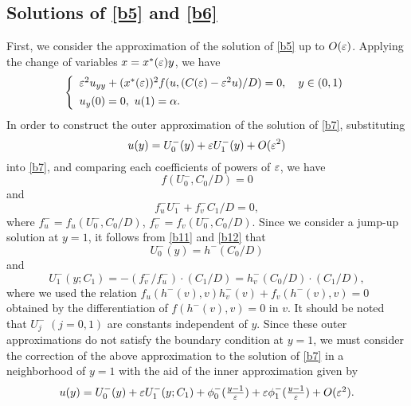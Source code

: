 \documentclass[a4,10pt]{article}
\begin{document}
\subsection{Solutions of \eqref{b5} and \eqref{b6}}\label{S2.1} %

First, we consider the approximation of the solution of \eqref{b5} up to $O(\varepsilon)$. Applying the change of variables $x = x^*(\varepsilon)y$, we have
%
\begin{equation}\label{b7}
\left \{
\begin{array}{l}
\varepsilon^2 u_{yy} + (x^*(\varepsilon))^2 f( u,  (C(\varepsilon) - \varepsilon^2 u )/D ) = 0, \ \ \ y \in (0, 1)   \\[1ex]
u_y(0) = 0, \ u(1) = \alpha.
\end{array} 
\right.
\end{equation}
%
In order to construct the outer approximation of the solution of \eqref{b7},
substituting 
%
\[%
u(y) = U^-_0(y) + \ep U^-_1(y) + O(\ep^2)
\]%
%
into \eqref{b7}, and comparing each coefficients of powers of $\varepsilon$, we have 
%
\begin{equation}\label{b11}
f( U^-_0, C_0/D) = 0 
\end{equation}
%
and
%
\begin{equation}\label{b12}
f_u^- U^-_1 + f_v^- C_1/D = 0,
\end{equation}
%
%
where $f_u^- = f_u( U^-_0, C_0/D)$, $f_v^- = f_v( U^-_0, C_0/D)$. 
Since we consider a jump-up solution at $y=1$, it follows from \eqref{b11} and
\eqref{b12} that
%
\begin{equation}\label{b14}
U^-_0(y) = h^{-}(C_0/D)
\end{equation}
%
and
%
\begin{equation}\label{b15}
U^-_1(y;C_1) = - (f_v^- / f_u^-) \cdot (C_1/D) = h^-_v(C_0/D) \cdot (C_1/D),
\end{equation}
%
where we used the relation $f_u(h^-(v), v) h^-_v(v) + f_v(h^-(v), v) = 0$
obtained by the differentiation of $f( h^-(v), v) = 0$ in $v$.
%
It should be noted that $U^-_j$ $(j=0, 1)$ are constants independent of $y$. 
%
Since these outer approximations do not satisfy the boundary condition at $y = 1$, 
we must consider the correction of the above approximation to the solution of \eqref{b7} in a neighborhood of $y = 1$ 
with the aid of the inner approximation given by
%
%
\begin{equation}\label{b17}
\begin{array}{l}
u(y)  =  U^-_0(y) + \varepsilon U^-_1(y;C_1) + \phi^-_0( \frac{y-1}{\varepsilon}) 
 + \varepsilon \phi^-_1(  \frac{y-1}{\varepsilon} ) + O(\varepsilon^2).
\end{array}
\end{equation}
\end{document}
